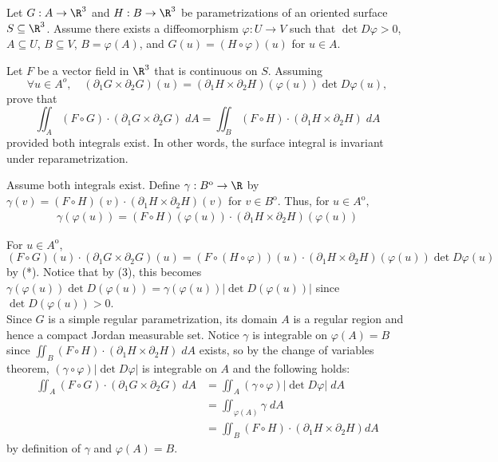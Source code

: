 \documentclass{exam}
\begin{document}
\begin{questions}
\pagebreak
\question  Let $G : A \to \R^3$ and $H : B \to \R^3$ be parametrizations of an oriented surface $S \subseteq \R^3$. Assume there exists a diffeomorphism $\varphi : U \to V$ such that $\det D\varphi > 0$, $A \subseteq U$, $B \subseteq V$, $B = \varphi(A)$,  and $G(u) = (H \circ \varphi)(u)$ for $u \in A$.  
\begin{parts}

\item Let $F$ be a vector field in $\R^3$ that is continuous on $S$. Assuming 	
\begin{equation} \label{cross}
\forall u \in A^o, \quad (\partial_1 G \times \partial_2 G)(u)  =   (\partial_1 H \times \partial_2H)(\varphi(u)) \det D\varphi(u),
\tag{$\star$} 		
\end{equation}
prove that 
\[
\iint_A (F \circ G)  \cdot (\partial_1 G \times \partial_2 G) \; dA =	\iint_B (F \circ H)  \cdot (\partial_1 H \times \partial_2 H) \; dA 
\]
provided both integrals exist. In other words, the surface integral is invariant under reparametrization. 
\begin{answer}{500pt}
Assume both integrals exist. Define $\gamma: B^{\mathrm{o}}\to\R$ by $\gamma(v)=(F\circ H)(v)\cdot(\partial_1 H \times \partial_2 H)(v)$ for $v\in B^{\mathrm{o}}$. Thus, for $u\in A^{\mathrm{o}},$\begin{align}
    \gamma(\varphi(u))=(F\circ H)(\varphi(u))\cdot(\partial_1 H \times \partial_2 H)(\varphi(u))
\end{align}

For $u\in A^{\mathrm{o}}$, $(F \circ G)(u)  \cdot (\partial_1 G \times \partial_2 G)(u) = (F \circ (H \circ \varphi))(u)\cdot(\partial_1 H \times \partial_2 H)(\varphi(u))\det D\varphi(u)$ by (*). Notice that by (3), this becomes $\gamma(\varphi(u))\det D(\varphi(u))=\gamma(\varphi(u))|\det D(\varphi(u))|$ since $\det D(\varphi(u))>0$.\\

Since $G$ is a simple regular parametrization, its domain $A$ is a regular region and hence a compact Jordan measurable set. Notice $\gamma$ is integrable on $\varphi(A)=B$ since $\iint_B (F \circ H)  \cdot (\partial_1 H \times \partial_2 H) \; dA$ exists, so by the change of variables theorem, $(\gamma\circ\varphi)|\det D\varphi|$ is integrable on $A$ and the following holds:\begin{equation*}\begin{split}
    \iint_A (F \circ G)  \cdot (\partial_1 G \times \partial_2 G) \; dA &=\iint_A (\gamma\circ\varphi)|\det D\varphi| \; dA \\
    &=\iint_{\varphi(A)}\gamma \; dA\\
    &=\iint_B (F\circ H)\cdot(\partial_1 H \times \partial_2 H) dA
\end{split}\end{equation*} by definition of $\gamma$ and $\varphi(A) = B$.
\end{answer}		


\end{parts}
\end{questions}
\end{document}
